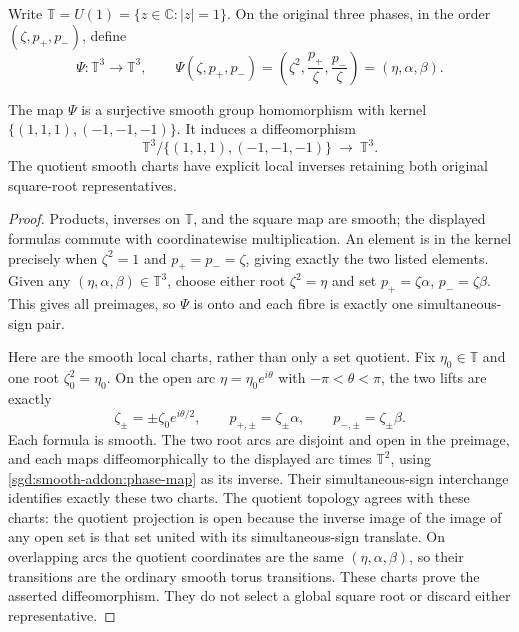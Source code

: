 Write $\mathbb T=U(1)=\{z\in\mathbb C:|z|=1\}$.
On the original three phases, in the order $(\zeta,p_+,p_-)$,
define
\begin{equation}
 \Psi:\mathbb T^3\longrightarrow\mathbb T^3,\qquad
 \Psi(\zeta,p_+,p_-)
       =\left(\zeta^2,\frac{p_+}{\zeta},\frac{p_-}{\zeta}\right)
       =(\eta,\alpha,\beta).
 \label{sgd:smooth-addon:phase-map}
\end{equation}

\begin{lemma}
\label{sgd:smooth-addon:phase-quotient}
The map $\Psi$ is a surjective smooth group homomorphism with kernel
$\{(1,1,1),(-1,-1,-1)\}$.
It induces a diffeomorphism
\[
 \mathbb T^3/\{(1,1,1),(-1,-1,-1)\}\ \longrightarrow\ \mathbb T^3.
\]
The quotient smooth charts have explicit local inverses retaining
both original square-root representatives.
\end{lemma}
\begin{proof}
Products, inverses on $\mathbb T$, and the square map are smooth;
the displayed formulas commute with coordinatewise multiplication.
An element is in the kernel precisely when $\zeta^2=1$ and
$p_+=p_-=\zeta$, giving exactly the two listed elements.
Given any $(\eta,\alpha,\beta)\in\mathbb T^3$, choose either root
$\zeta^2=\eta$ and set $p_+=\zeta\alpha$, $p_-=\zeta\beta$.
This gives all preimages, so $\Psi$ is onto and each fibre is
exactly one simultaneous-sign pair.

Here are the smooth local charts, rather than only a set quotient.
Fix $\eta_0\in\mathbb T$ and one root $\zeta_0^2=\eta_0$.
On the open arc $\eta=\eta_0e^{i\theta}$ with $-\pi<\theta<\pi$,
the two lifts are exactly
\[
 \zeta_\pm=\pm\zeta_0e^{i\theta/2},\qquad
 p_{+,\pm}=\zeta_\pm\alpha,\qquad
 p_{-,\pm}=\zeta_\pm\beta.
\]
Each formula is smooth. The two root arcs are disjoint and open
in the preimage, and each maps diffeomorphically to the displayed
arc times $\mathbb T^2$, using \eqref{sgd:smooth-addon:phase-map}
as its inverse. Their simultaneous-sign interchange identifies
exactly these two charts.
The quotient topology agrees with these charts: the quotient
projection is open because the inverse image of the image of any
open set is that set united with its simultaneous-sign translate.
On overlapping arcs the quotient coordinates are the same
$(\eta,\alpha,\beta)$, so their transitions are the ordinary smooth
torus transitions. These charts prove the asserted diffeomorphism.
They do not select a global square root or discard either representative.
\end{proof}


